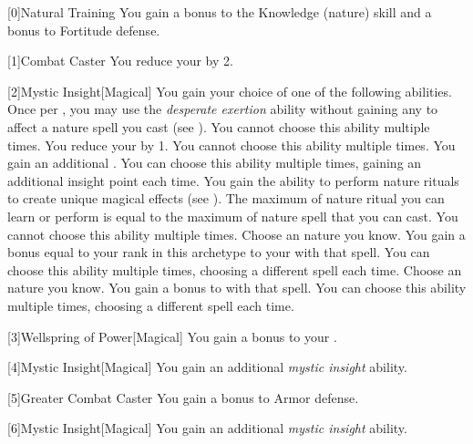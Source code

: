         [0]{Natural Training} You gain a  bonus to the Knowledge (nature) skill and a  bonus to Fortitude defense.

        [1]{Combat Caster} You reduce your  by 2.

        [2]{Mystic Insight}[Magical]
        You gain your choice of one of the following abilities.
        {
             Once per , you may use the \textit{desperate exertion} ability without gaining any  to affect a nature spell you cast (see ).
                You cannot choose this ability multiple times.
             You reduce your  by 1.
                You cannot choose this ability multiple times.
             You gain an additional .
                You can choose this ability multiple times, gaining an additional insight point each time.
             You gain the ability to perform nature rituals to create unique magical effects (see ).
                The maximum  of nature ritual you can learn or perform is equal to the maximum  of nature spell that you can cast.
                You cannot choose this ability multiple times.
             Choose an nature  you know.
                You gain a bonus equal to your rank in this archetype to your  with that spell.
                You can choose this ability multiple times, choosing a different spell each time.
             Choose an nature  you know.
                You gain a  bonus to  with that spell.
                You can choose this ability multiple times, choosing a different spell each time.
        }

        [3]{Wellspring of Power}[Magical]
        You gain a  bonus to your  .

        [4]{Mystic Insight}[Magical]
        You gain an additional \textit{mystic insight} ability.

        [5]{Greater Combat Caster} You gain a  bonus to Armor defense.

        [6]{Mystic Insight}[Magical]
        You gain an additional \textit{mystic insight} ability.

